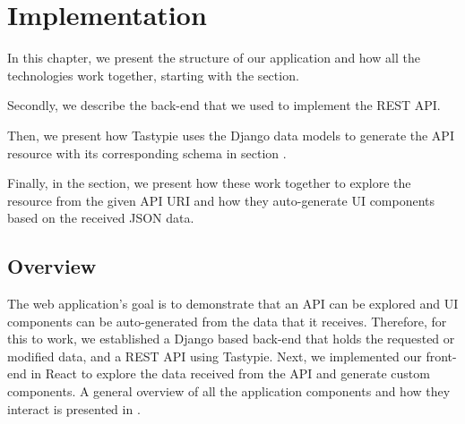 \chapter{Implementation}
\label{chapter:implementation}

In this chapter, we present the structure of our application and how all the technologies work together, starting with the  section.

Secondly, we describe the back-end  that we used to implement the REST API.

Then, we present how Tastypie uses the Django data models to generate the API resource with its corresponding schema in section .

Finally, in the  section, we present how these work together to explore the resource from the given API URI and how they auto-generate UI components based on the received JSON data.

\section{Overview}
\label{sec:overview}

The web application's goal is to demonstrate that an API can be explored and UI components can be auto-generated from the data that it receives. Therefore, for this to work, we established a Django based back-end that holds the requested or modified data, and a REST API using Tastypie. Next, we implemented our front-end in React to explore the data received from the API and generate custom components. A general overview of all the application components and how they interact is presented in . %


